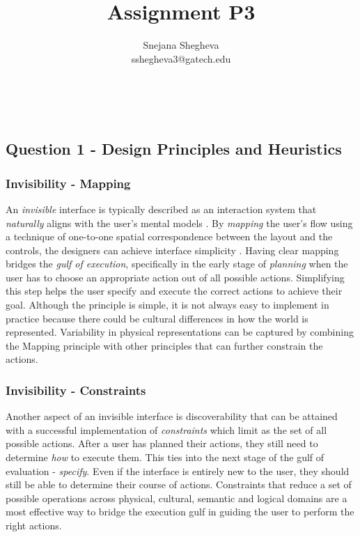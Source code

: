 \documentclass[12pt,letterpaper]{article}
\makeatletter
\renewcommand{\maketitle}{\bgroup
   \begin{center}
   \textbf{{\fontsize{18pt}{20}\selectfont \@title}}\\
   \vspace{10pt}
   {\fontsize{12pt}{0}\selectfont \@author} 
   \end{center}
}
\makeatother
\begin{document}
\title{Assignment P3}
\author{Snejana Shegheva \\ sshegheva3@gatech.edu}

\maketitle
\thispagestyle{fancy}

\subsection*{Question 1 - Design Principles and Heuristics}

\subsubsection*{Invisibility - Mapping}

An \textit{invisible} interface is typically described as an interaction system that \textit{naturally} aligns with the user's mental models \cite{blog:fastcompany}. By \textit{mapping} the user's flow using a technique of one-to-one spatial correspondence between the layout and the controls, the designers can achieve interface simplicity \cite{norman2013design}. Having clear mapping bridges the \textit{gulf of execution}, specifically in the early stage of \textit{planning} when the user has to choose an appropriate action out of all possible actions. Simplifying this step helps the user specify and execute the correct actions to achieve their goal. Although the principle is simple, it is not always easy to implement in practice because there could be cultural differences in how the world is represented. Variability in physical representations can be captured by combining the Mapping principle with other principles that can further constrain the actions. 

\subsubsection*{Invisibility - Constraints}
Another aspect of an invisible interface is discoverability that can be attained with a successful implementation of \textit{constraints} which limit as the set of all possible actions. After a user has planned their actions, they still need to determine \textit{how} to execute them. This ties into the next stage of the gulf of evaluation - \textit{specify}. Even if the interface is entirely new to the user, they should still be able to determine their course of actions. Constraints that reduce a set of possible operations across physical, cultural, semantic and logical domains are a most effective way to bridge the execution gulf in guiding the user to perform the right actions.
\end{document}
